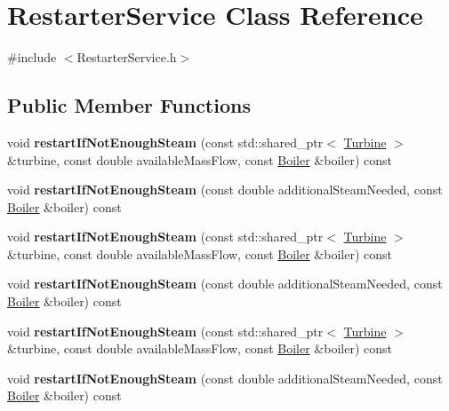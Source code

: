 \hypertarget{class_restarter_service}{}\section{Restarter\+Service Class Reference}
\label{class_restarter_service}


{\ttfamily \#include $<$Restarter\+Service.\+h$>$}

\subsection*{Public Member Functions}
\begin{DoxyCompactItemize}
\item 
\mbox{\label{class_restarter_service_a8e1e6e69eef0126b749b71dca67a4a80}} 
void {\bfseries restart\+If\+Not\+Enough\+Steam} (const std\+::shared\+\_\+ptr$<$ \hyperlink{class_turbine}{Turbine} $>$ \&turbine, const double available\+Mass\+Flow, const \hyperlink{class_boiler}{Boiler} \&boiler) const
\item 
\mbox{\label{class_restarter_service_a3ace3669eeec0195d491b5e8135b6823}} 
void {\bfseries restart\+If\+Not\+Enough\+Steam} (const double additional\+Steam\+Needed, const \hyperlink{class_boiler}{Boiler} \&boiler) const
\item 
\mbox{\label{class_restarter_service_a8e1e6e69eef0126b749b71dca67a4a80}} 
void {\bfseries restart\+If\+Not\+Enough\+Steam} (const std\+::shared\+\_\+ptr$<$ \hyperlink{class_turbine}{Turbine} $>$ \&turbine, const double available\+Mass\+Flow, const \hyperlink{class_boiler}{Boiler} \&boiler) const
\item 
\mbox{\label{class_restarter_service_a3ace3669eeec0195d491b5e8135b6823}} 
void {\bfseries restart\+If\+Not\+Enough\+Steam} (const double additional\+Steam\+Needed, const \hyperlink{class_boiler}{Boiler} \&boiler) const
\item 
\mbox{\label{class_restarter_service_a8e1e6e69eef0126b749b71dca67a4a80}} 
void {\bfseries restart\+If\+Not\+Enough\+Steam} (const std\+::shared\+\_\+ptr$<$ \hyperlink{class_turbine}{Turbine} $>$ \&turbine, const double available\+Mass\+Flow, const \hyperlink{class_boiler}{Boiler} \&boiler) const
\item 
\mbox{\label{class_restarter_service_a3ace3669eeec0195d491b5e8135b6823}} 
void {\bfseries restart\+If\+Not\+Enough\+Steam} (const double additional\+Steam\+Needed, const \hyperlink{class_boiler}{Boiler} \&boiler) const
\end{DoxyCompactItemize}


